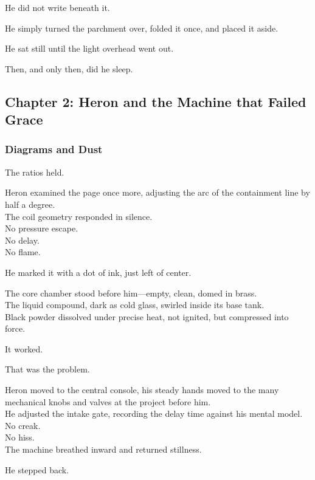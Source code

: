 \documentclass[12pt]{article}
\begin{document}
He did not write beneath it.

He simply turned the parchment over, folded it once, and placed it aside.

He sat still until the light overhead went out.

Then, and only then, did he sleep.

\newpage

\subsection*{Chapter 2: Heron and the Machine that Failed Grace}

\vspace{.5in}

\subsubsection*{Diagrams and Dust}

The ratios held.

Heron examined the page once more, adjusting the arc of the containment line by half a degree.\\
The coil geometry responded in silence.\\
No pressure escape.\\
No delay.\\
No flame.

He marked it with a dot of ink, just left of center.

The core chamber stood before him—empty, clean, domed in brass.\\
The liquid compound, dark as cold glass, swirled inside its base tank.\\
Black powder dissolved under precise heat, not ignited, but compressed into force.

It worked.

That was the problem.

\vspace{1em}

Heron moved to the central console, his steady hands moved to the many mechanical knobs and valves at the project before him.\\
He adjusted the intake gate, recording the delay time against his mental model.\\
No creak.\\
No hiss.\\
The machine breathed inward and returned stillness.

He stepped back.
\end{document}
